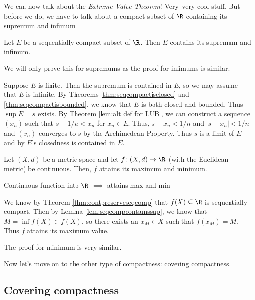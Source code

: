 \documentclass[class=article, crop=false]{standalone}
\begin{document}
We can now talk about the \textit{Extreme Value Theorem}! Very, very cool stuff. But before we do, we have to talk about a compact subset of $\R$ containing its supremum and infimum.

\begin{lem}{\label{lem:seqcompcontainssup}}
    Let $E$ be a sequentially compact subset of $\R$. Then $E$ contains its supremum and infimum.
\end{lem}
\begin{pf}
    We will only prove this for supremums as the proof for infimums is similar.

    Suppose $E$ is finite. Then the supremum is contained in $E$, so we may assume that $E$ is infinite. By Theorems \ref{thm:seqcompactisclosed} and \ref{thm:seqcompactisbounded}, we know that $E$ is both closed and bounded. Thus $\sup E = s$ exists. By Theorem \ref{lem:alt def for LUB}, we can construct a sequence $(x_n)$ such that $s-1/n < x_n$
    for $x_n \in E$. Thus, $s-x_n < 1/n$ and $|s-x_n| < 1/n$ and $(x_n)$ converges to $s$ by the Archimedean Property. Thus $s$ is a limit of $E$ and by $E$'s closedness is contained in $E$.
\end{pf}


\begin{thm}{\label{thm:evt}}
    Let $(X,d)$ be a metric space and let $f \colon (X,d) \to \R$ (with the Euclidean metric) be continuous. Then, $f$ attains its maximum and minimum.
\end{thm}
\begin{slogan}
    Continuous function into $\R$ $\implies$ attains max and min
\end{slogan}
\begin{pf}
    We know by Theorem \ref{thm:contpreserveseqcomp} that $f(X) \subseteq \R$ is sequentially compact. Then by Lemma \ref{lem:seqcompcontainssup}, we know that $M = \inf f(X) \in f(X)$, so there exists an $x_M \in X$ such that $f(x_M) = M$. Thus $f$ attains its maximum value.

    The proof for minimum is very similar.
\end{pf}


Now let's move on to the other type of compactness: covering compactness.



\subsection{Covering compactness}
\end{document}
